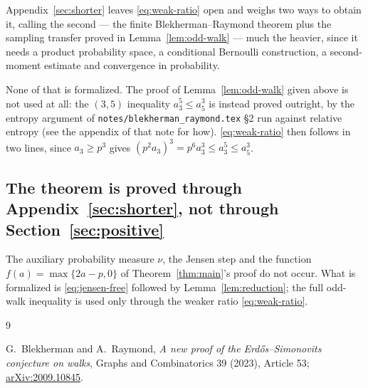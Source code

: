 \documentclass[11pt]{article}
\begin{document}
Appendix~\ref{sec:shorter} leaves \eqref{eq:weak-ratio} open and weighs two
ways to obtain it, calling the second --- the finite Blekherman--Raymond
theorem plus the sampling transfer proved in Lemma~\ref{lem:odd-walk} ---
much the heavier, since it needs a product probability space, a conditional
Bernoulli construction, a second-moment estimate and convergence in
probability.

None of that is formalized.  The proof of Lemma~\ref{lem:odd-walk} given above
is not used at all: the $(3,5)$ inequality $a_3^5\leq a_5^3$ is instead proved
outright, by the entropy argument of \texttt{notes/blekherman\_raymond.tex}
\S2 run against relative entropy (see the appendix of that note for how).
\eqref{eq:weak-ratio} then follows in two lines, since $a_3\geq p^3$ gives
$(p^2a_3)^3=p^6a_3^3\leq a_3^5\leq a_5^3$.

\subsection*{The theorem is proved through Appendix~\ref{sec:shorter}, not
through Section~\ref{sec:positive}}

The auxiliary probability measure $\nu$, the Jensen step and the function
$f(a)=\max\{2a-p,0\}$ of Theorem~\ref{thm:main}'s proof do not occur.  What is
formalized is \eqref{eq:jensen-free} followed by Lemma~\ref{lem:reduction};
the full odd-walk inequality is used only through the weaker ratio
\eqref{eq:weak-ratio}.

\begin{thebibliography}{9}

G.~Blekherman and A.~Raymond,
\emph{A new proof of the Erd\H{o}s--Simonovits conjecture on walks},
Graphs and Combinatorics 39 (2023), Article 53;
\href{https://arxiv.org/abs/2009.10845}{arXiv:2009.10845}.

\end{thebibliography}
\end{document}
